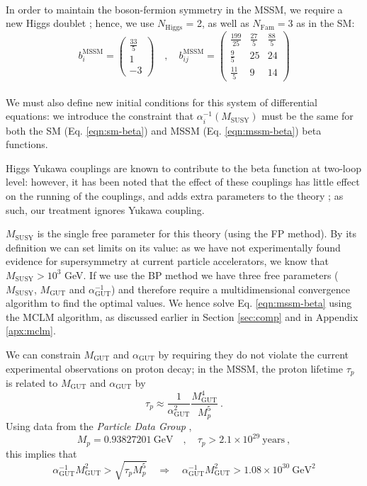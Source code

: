 \documentclass[12pt,a4paper,oneside]{article}
\begin{document}
\\
\doublespace
In order to maintain the boson-fermion symmetry in the MSSM, we require a new Higgs doublet \cite{mssm}; hence, we use $N_\mathrm{Higgs}$ = 2, as well as $N_\mathrm{Fam} = 3$ as in the SM:
\singlespace
\begin{equation}
b^\mathrm{MSSM}_i = 
\begin{pmatrix} \frac{33}{5} \\ 1 \\ -3 \end{pmatrix}
\quad,\quad
b^\mathrm{MSSM}_{ij} = 
\begin{pmatrix} 
\frac{199}{25} & \frac{27}{5} & \frac{88}{5} \\ 
\frac{9}{5} & 25 & 24 \\ 
\frac{11}{5} & 9 & 14
\end{pmatrix}
\label{eqn:mssm-bi-bij}
\end{equation}
\\
\doublespace
We must also define new initial conditions for this system of differential equations: we introduce the constraint that $\alpha^{-1}_i (M_\mathrm{SUSY})$ must be the same for both the SM (Eq. \ref{eqn:sm-beta}) and MSSM (Eq. \ref{eqn:mssm-beta}) beta functions.

Higgs Yukawa couplings are known to contribute to the beta function at two-loop level: however, it has been noted that the effect of these couplings has little effect on the running of the couplings, and adds extra parameters to the theory \cite{yukawa}; as such, our treatment ignores Yukawa coupling.

$M_\mathrm{SUSY}$ is the single free parameter for this theory (using the FP method). By its definition we can set limits on its value: as we have not experimentally found evidence for supersymmetry at current particle accelerators, we know that $M_\mathrm{SUSY} > 10^3$ GeV. If we use the BP method we have three free parameters ($M_\mathrm{SUSY}$, $M_\mathrm{GUT}$ and $\alpha_\mathrm{GUT}^{-1}$) and therefore require a multidimensional convergence algorithm to find the optimal values.  We hence solve Eq. \ref{eqn:mssm-beta} using the MCLM algorithm, as discussed earlier in Section \ref{sec:comp} and in Appendix \ref{apx:mclm}.

We can constrain $M_\mathrm{GUT}$ and $\alpha_\mathrm{GUT}$ by requiring they do not violate the current experimental observations on proton decay; in the MSSM, the proton lifetime $\tau_p$ is related to $M_\mathrm{GUT}$ and $\alpha_\mathrm{GUT}$ by \cite{amaldi}
\begin{equation}
\tau_p \approx \frac{1}{\alpha_\mathrm{GUT}^2} \frac{M_\mathrm{GUT}^4}{M_p^5} \:.
\label{eqn:proton}
\end{equation}
Using data from the \textit{Particle Data Group} \cite{pdg},
\[
M_p = 0.93827201 \:\mathrm{GeV} \quad,\quad \tau_p > 2.1 \times 10^{29} \:\mathrm{years} \:,
\]
this implies that
\begin{equation}
\alpha_\mathrm{GUT}^{-1} M_\mathrm{GUT}^2 > \sqrt{\tau_p M_p^5} \quad\Rightarrow\quad \alpha_\mathrm{GUT}^{-1} M_\mathrm{GUT}^2 > 1.08 \times 10^{30} \:\mathrm{GeV}^2
\label{eqn:proton-limit}
\end{equation}
\end{document}
